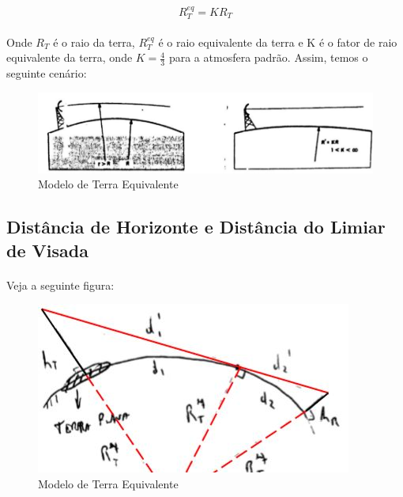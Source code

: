 \begin{equation}
    R_T^{eq} = KR_T
    \label{1}
\end{equation}

\paragraph{}Onde $R_T$ é o raio da terra, $R_T^{eq}$ é o raio equivalente da terra e K é o fator de raio equivalente da terra, onde $K = \frac{4}{3}$ para a atmosfera padrão. Assim, temos o seguinte cenário:

\FloatBarrier
\begin{figure}[!htp]
\centering
\includegraphics[scale = 0.5]{Figuras/Mod_Terr_Equ.JPG}
\caption{Modelo de Terra Equivalente \citep{Andrezo}}
\end{figure}
\FloatBarrier

\subsection{Distância de Horizonte e Distância do Limiar de Visada}

\paragraph{}Veja a seguinte figura:

\FloatBarrier
\begin{figure}[!htp]
\centering
\includegraphics[scale = 0.5]{Figuras/Dist_Hor.JPG}
\caption{Modelo de Terra Equivalente \citep{Andrezo}}
\end{figure}
\FloatBarrier


